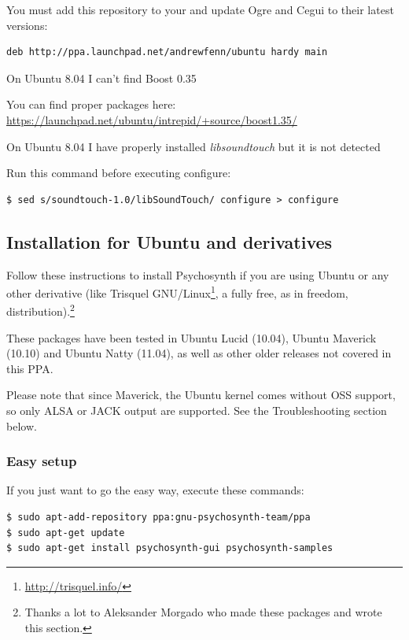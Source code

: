 You must add this repository to your
 and update Ogre and Cegui to their latest
versions:

\begin{verbatim}
deb http://ppa.launchpad.net/andrewfenn/ubuntu hardy main
\end{verbatim}

\begin{troubleshoot}
  On Ubuntu 8.04 I can't find Boost 0.35
\end{troubleshoot}

You can find proper  packages here: 
\url{https://launchpad.net/ubuntu/intrepid/+source/boost1.35/}

\begin{troubleshoot}
  On Ubuntu 8.04 I have properly installed \emph{libsoundtouch} but it
  is not detected
\end{troubleshoot}

Run this command before executing configure:

\begin{verbatim}
$ sed s/soundtouch-1.0/libSoundTouch/ configure > configure
\end{verbatim}

\subsection{Installation for Ubuntu and derivatives}

Follow these instructions to install Psychosynth if you are using
Ubuntu or any other derivative (like Trisquel
GNU/Linux\footnote{\url{http://trisquel.info/}}, a fully free, as in
freedom, distribution).\footnote{Thanks a lot to Aleksander Morgado
  who made these packages and wrote this section.}

These packages have been tested in Ubuntu Lucid (10.04), Ubuntu
Maverick (10.10) and Ubuntu Natty (11.04), as well as other older
releases not covered in this PPA.

Please note that since Maverick, the Ubuntu kernel comes without OSS
support, so only ALSA or JACK output are supported. See the
Troubleshooting section below.

\subsubsection{Easy setup}

If you just want to go the easy way, execute these commands:

\begin{verbatim}
$ sudo apt-add-repository ppa:gnu-psychosynth-team/ppa
$ sudo apt-get update
$ sudo apt-get install psychosynth-gui psychosynth-samples 
\end{verbatim}

